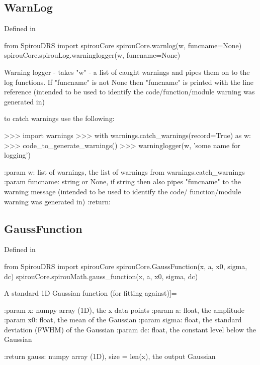 \noindent\begin{minipage}{\textwidth}
\subsection{WarnLog}

Defined in \spirouCore{}

\begin{pythonbox}
from SpirouDRS import spirouCore
spirouCore.warnlog(w, funcname=None)
spirouCore.spirouLog.warninglogger(w, funcname=None)
\end{pythonbox}

\begin{pythondocstring}
Warning logger - takes "w" - a list of caught warnings and pipes them on
to the log functions.
If "funcname" is not None then "funcname" is printed with the line reference
(intended to be used to identify the code/function/module warning was
generated in)

to catch warnings use the following:

>>> import warnings
>>> with warnings.catch_warnings(record=True) as w:
>>>     code_to_generate_warnings()
>>> warninglogger(w, 'some name for logging')

:param w: list of warnings, the list of warnings from
           warnings.catch_warnings
:param funcname: string or None, if string then also pipes "funcname" to the
                 warning message (intended to be used to identify the code/
                 function/module warning was generated in)
:return:
\end{pythondocstring}
\end{minipage}

\noindent\begin{minipage}{\textwidth}
\subsection{GaussFunction}

Defined in \spirouCore{}

\begin{pythonbox}
from SpirouDRS import spirouCore
spirouCore.GaussFunction(x, a, x0, sigma, dc)
spirouCore.spirouMath.gauss_function(x, a, x0, sigma, dc)
\end{pythonbox}

\begin{pythondocstring}
A standard 1D Gaussian function (for fitting against)]=

:param x: numpy array (1D), the x data points
:param a: float, the amplitude
:param x0: float, the mean of the Gaussian
:param sigma: float, the standard deviation (FWHM) of the Gaussian
:param dc: float, the constant level below the Gaussian

:return gauss: numpy array (1D), size = len(x), the output Gaussian
\end{pythondocstring}
\end{minipage}

